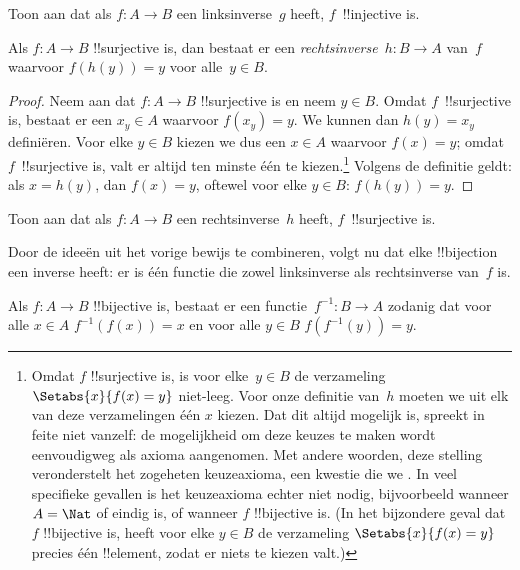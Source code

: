 \documentclass[openany]{memoir}
\begin{document}
\begin{prob}
Toon aan dat als $f\colon A \to B$ een linksinverse~$g$ heeft,
$f$~!!{injective} is.
\end{prob}

\begin{prop}
    Als $f\colon A \to B$ !!{surjective} is, dan bestaat er een
    \emph{rechtsinverse}~$h\colon B \to A$ van~$f$ waarvoor
    $f(h(y)) = y$ voor alle~$y \in B$.
\end{prop}

\begin{proof}
Neem aan dat $f\colon A \to B$ !!{surjective} is en neem $y \in B$.
Omdat $f$~!!{surjective} is, bestaat er een $x_y \in A$ waarvoor
$f(x_y) = y$. We kunnen dan $h(y) = x_y$ definiëren. Voor elke
$y \in B$ kiezen we dus een $x \in A$ waarvoor $f(x) = y$; omdat
$f$~!!{surjective} is, valt er altijd ten minste één te
kiezen.\footnote{Omdat $f$ !!{surjective} is, is voor elke~$y \in B$
de verzameling $\Setabs{x}{f(x) = y}$ niet-leeg. Voor onze definitie
van~$h$ moeten we uit elk van deze verzamelingen één $x$ kiezen. Dat
dit altijd mogelijk is, spreekt in feite niet vanzelf: de mogelijkheid
om deze keuzes te maken wordt eenvoudigweg als axioma aangenomen. Met
andere woorden, deze stelling veronderstelt het zogeheten
keuzeaxioma, een kwestie die we
.
In veel specifieke gevallen is het keuzeaxioma echter niet nodig,
bijvoorbeeld wanneer $A = \Nat$ of eindig is, of wanneer $f$
!!{bijective} is. (In het bijzondere geval dat $f$ !!{bijective} is,
heeft voor elke $y \in B$ de verzameling $\Setabs{x}{f(x) = y}$
precies één !!{element}, zodat er niets te kiezen valt.)}
Volgens de definitie geldt: als $x = h(y)$, dan $f(x) = y$, oftewel
voor elke $y \in B$: $f(h(y)) = y$.
\end{proof}

\begin{prob}
Toon aan dat als $f\colon A \to B$ een rechtsinverse~$h$ heeft,
$f$~!!{surjective} is.
\end{prob}

\begin{explain}
  Door de ideeën uit het vorige bewijs te combineren, volgt nu dat
  elke !!{bijection} een inverse heeft: er is één functie die zowel
  linksinverse als rechtsinverse van~$f$ is.
\end{explain}

\begin{prop}
Als $f\colon A \to B$ !!{bijective} is, bestaat er een
functie~$f^{-1}\colon B \to A$ zodanig dat voor alle $x \in A$
$f^{-1}(f(x)) = x$ en voor alle $y \in B$ $f(f^{-1}(y)) = y$.
\end{prop}
\end{document}
